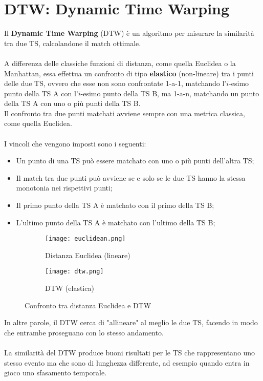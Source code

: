 \section{DTW: Dynamic Time Warping}
Il \textbf{Dynamic Time Warping} (DTW) è un algoritmo per misurare la similarità tra due TS, calcolandone il match ottimale.\\
\\
A differenza delle classiche funzioni di distanza, come quella Euclidea o la Manhattan, essa effettua un confronto di tipo \textbf{elastico} (non-lineare) tra i punti delle due TS, ovvero che esse non sono confrontate 1-a-1, matchando l'$i$-esimo punto della TS A con l'$i$-esimo punto della TS B, ma 1-a-n, matchando un punto della TS A con uno o più punti della TS B.\\
Il confronto tra due punti matchati avviene sempre con una metrica classica, come quella Euclidea.\\
\\
I vincoli che vengono imposti sono i seguenti:
\begin{itemize}
	\item Un punto di una TS può essere matchato con uno o più punti dell'altra TS;
	\item Il match tra due punti può avviene se e solo se le due TS hanno la stessa monotonia nei rispettivi punti;
	\item Il primo punto della TS A è matchato con il primo della TS B;
	\item L'ultimo punto della TS A è matchato con l'ultimo della TS B; 
\end{itemize}
\begin{figure}[H]
	\centering
	\begin{subfigure}{.5\textwidth}
		\centering
		\texttt{[image: euclidean.png]}
		\caption{Distanza Euclidea (lineare)}
		\label{fig:distance_euclidean}
	\end{subfigure}%
	\begin{subfigure}{.5\textwidth}
		\centering
		\texttt{[image: dtw.png]}
		\caption{DTW (elastica)}
		\label{fig:distance_dtw}
	\end{subfigure}
	\caption{Confronto tra distanza Euclidea e DTW}
	\label{fig:distance}
\end{figure}
In altre parole, il DTW cerca di "allineare" al meglio le due TS, facendo in modo che entrambe proseguano con lo stesso andamento.\\
\\
La similarità del DTW produce buoni risultati per le TS che rappresentano uno stesso evento ma che sono di lunghezza differente, ad esempio quando entra in gioco uno sfasamento temporale.\\
